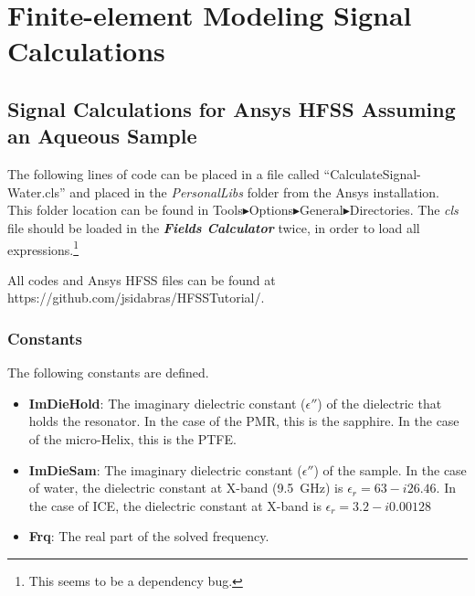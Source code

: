 \chapter[Finite-element Modeling Signal Calculations]{Finite-element Modeling Signal Calculations}

\section*{Signal Calculations for Ansys HFSS Assuming an Aqueous Sample}

The following lines of code can be placed in a file called ``CalculateSignal-Water.cls'' and placed in the \textit{PersonalLibs} folder from the Ansys installation. This folder location can be found in Tools$\blacktriangleright$Options$\blacktriangleright$General$\blacktriangleright$Directories.  The \textit{cls} file should be loaded in the \textit{\textbf{Fields Calculator}} twice, in order to load all expressions.\footnote{This seems to be a dependency bug.} 

All codes and Ansys HFSS files can be found at https://github.com/jsidabras/HFSSTutorial/.


\subsection*{Constants}
The following constants are defined. 
\begin{itemize}
    \item \textbf{ImDieHold}: The imaginary dielectric constant ($\epsilon''$) of the dielectric that holds the resonator. In the case of the PMR, this is the sapphire. In the case of the micro-Helix, this is the PTFE.
    \item \textbf{ImDieSam}: The imaginary dielectric constant ($\epsilon''$) of the sample. In the case of water, the dielectric constant at X-band (9.5~GHz) is $\epsilon_r = 63 - i 26.46$. In the case of ICE, the dielectric constant at X-band is $\epsilon_r = 3.2 - i 0.00128$
    \item \textbf{Frq}: The real part of the solved frequency.
\end{itemize}{}

\newpage

